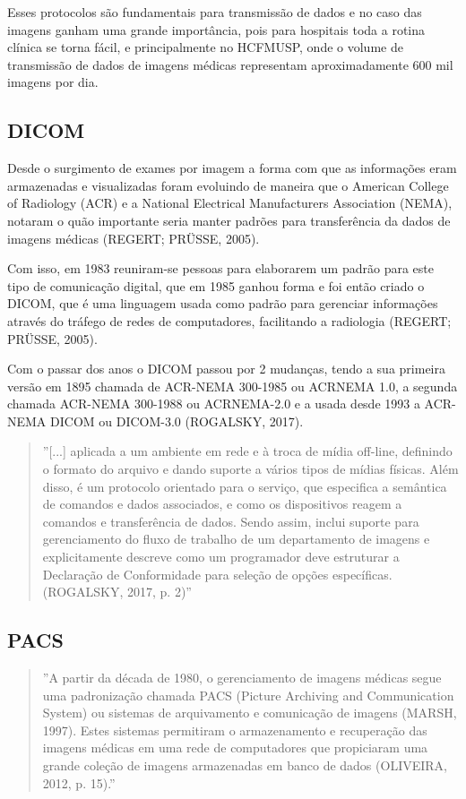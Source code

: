\documentclass[
	12pt,				%
	openright,			%
	twoside,			%
	a4paper,			%
	english,			%
	french,				%
	spanish,			%
	brazil				%
	]{abntex2}
\begin{document}
Esses protocolos são fundamentais para transmissão de dados e no caso das imagens ganham uma grande importância, pois para hospitais toda a rotina clínica se torna fácil, e principalmente no HCFMUSP, onde o volume de transmissão de dados de imagens médicas representam aproximadamente 600 mil imagens por dia. 

\subsection{DICOM}

Desde o surgimento de exames por imagem a forma com que as informações eram armazenadas e visualizadas foram evoluindo de maneira que o American College of Radiology (ACR) e a National Electrical Manufacturers Association (NEMA), notaram o quão importante seria manter padrões para transferência da dados de imagens médicas (REGERT; PRÜSSE, 2005).

Com isso, em 1983 reuniram-se pessoas para elaborarem um padrão para este tipo de comunicação digital, que em 1985 ganhou forma e foi então criado o DICOM, que é uma linguagem usada como padrão para gerenciar informações através do tráfego de redes de computadores, facilitando a radiologia (REGERT; PRÜSSE, 2005).

Com o passar dos anos o DICOM passou por 2 mudanças, tendo a sua primeira versão em 1895 chamada de ACR-NEMA 300-1985 ou ACRNEMA 1.0, a segunda chamada ACR-NEMA 300-1988 ou ACRNEMA-2.0 e a usada desde 1993 a ACR-NEMA DICOM ou DICOM-3.0 (ROGALSKY, 2017).

\begin{quote}
''[...] aplicada a um ambiente em rede e à troca de mídia off-line, definindo o formato do arquivo e dando suporte a vários tipos de mídias físicas. Além disso, é um protocolo orientado para o serviço, que especifica a semântica de comandos e dados associados, e como os dispositivos reagem a comandos e transferência de dados. Sendo assim, inclui suporte para gerenciamento do fluxo de trabalho de um departamento de imagens e explicitamente descreve como um programador deve estruturar a Declaração de Conformidade para seleção de opções específicas. (ROGALSKY, 2017, p. 2)''
\end{quote}

\subsection{PACS}

\begin{quote}
''A partir da década de 1980, o gerenciamento de imagens médicas segue uma padronização chamada PACS (Picture Archiving and Communication System) ou sistemas de arquivamento e comunicação de imagens (MARSH, 1997). Estes sistemas permitiram o armazenamento e recuperação das imagens médicas em uma rede de computadores que propiciaram uma grande coleção de imagens armazenadas em banco de dados (OLIVEIRA, 2012, p. 15).''\end{quote}
\end{document}
